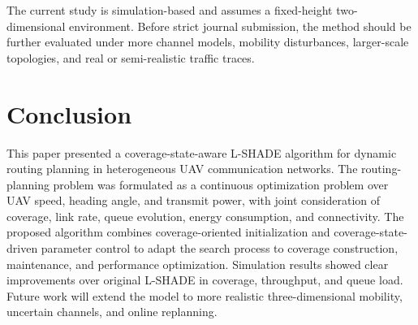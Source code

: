 \documentclass[lettersize,journal]{IEEEtran}
\begin{document}
The current study is simulation-based and assumes a fixed-height two-dimensional environment. Before strict journal submission, the method should be further evaluated under more channel models, mobility disturbances, larger-scale topologies, and real or semi-realistic traffic traces.

\section{Conclusion}
This paper presented a coverage-state-aware L-SHADE algorithm for dynamic routing planning in heterogeneous UAV communication networks. The routing-planning problem was formulated as a continuous optimization problem over UAV speed, heading angle, and transmit power, with joint consideration of coverage, link rate, queue evolution, energy consumption, and connectivity. The proposed algorithm combines coverage-oriented initialization and coverage-state-driven parameter control to adapt the search process to coverage construction, maintenance, and performance optimization. Simulation results showed clear improvements over original L-SHADE in coverage, throughput, and queue load. Future work will extend the model to more realistic three-dimensional mobility, uncertain channels, and online replanning.



\end{document}
